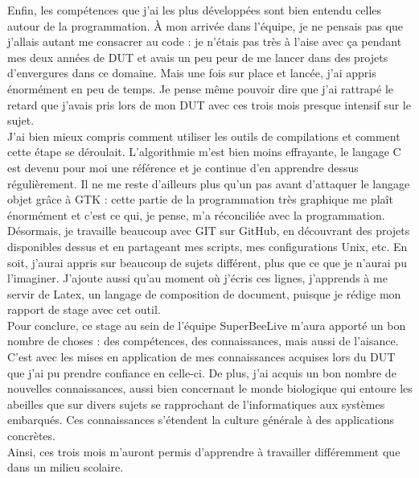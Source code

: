 \documentclass[11pt,french,a4paper]{report}
\begin{document}
Enfin, les compétences que j'ai les plus développées sont bien entendu celles autour de la programmation. 
À mon arrivée dans l'équipe, je ne pensais pas que j'allais autant me consacrer au code : je n'étais pas très à l'aise avec ça 
pendant mes deux années de DUT et avais un peu peur de me lancer dans des projets d'envergures dans ce domaine. 
Mais une fois sur place et lancée, j'ai appris énormément en peu de temps. Je pense même pouvoir dire que j'ai rattrapé le retard 
que j'avais pris lors de mon DUT avec ces trois mois presque intensif sur le sujet. \\
J'ai bien mieux compris comment utiliser les outils de compilations et comment cette étape se déroulait. L'algorithmie m'est bien moins
effrayante, le langage C est devenu pour moi une référence et je continue d'en apprendre dessus régulièrement. 
Il ne me reste d'ailleurs plus qu'un pas avant d'attaquer le langage objet grâce à GTK : cette partie de la programmation très graphique
me plaît énormément et c'est ce qui, je pense, m'a réconciliée avec la programmation. \\
Désormais, je travaille beaucoup avec GIT sur GitHub, en découvrant des projets disponibles dessus et en partageant mes scripts,
mes configurations Unix, etc. 
En soit, j'aurai appris sur beaucoup de sujets différent, plus que ce que je n'aurai pu l'imaginer.
J'ajoute aussi qu'au moment où j'écris ces lignes, j'apprends à me servir de Latex, un langage de composition de document, 
puisque je rédige mon rapport de stage avec cet outil.\\

Pour conclure, ce stage au sein de l'équipe SuperBeeLive m'aura apporté un bon nombre de choses : des compétences, des connaissances, mais 
aussi de l'aisance. C'est avec les mises en application de mes connaissances acquises lors du DUT que j'ai pu prendre confiance en celle-ci.
De plus, j'ai acquis un bon nombre de nouvelles connaissances, aussi bien concernant le monde biologique qui entoure les abeilles que sur 
divers sujets se rapprochant de l'informatiques aux systèmes embarqués. Ces connaissances s'étendent la culture générale à des applications 
concrètes.\\
Ainsi, ces trois mois m'auront permis d'apprendre à travailler différemment que dans un milieu scolaire. 
\end{document}
